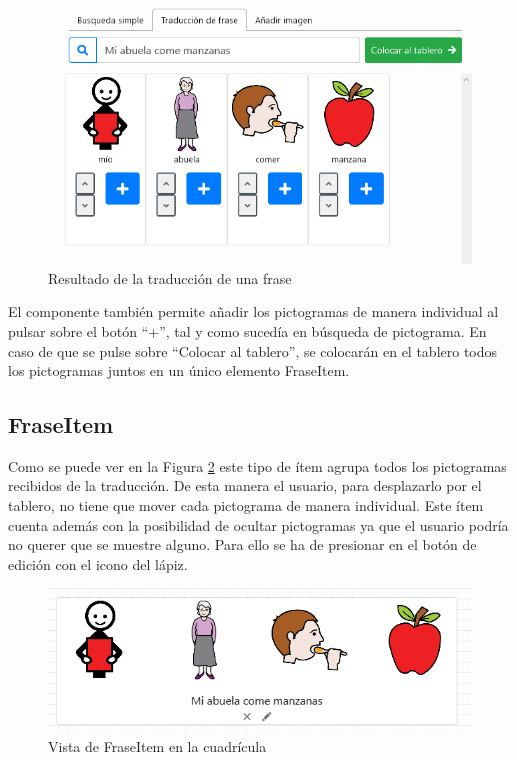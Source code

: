 \begin{figure}[h!]
	\centering
	\includegraphics[width=0.7\linewidth]{Imagenes/Bitmap/traduccionPicto}
	\caption{Resultado de la traducción de una frase}
	\label{fig:traduccionpicto}
\end{figure}

El componente también permite añadir los pictogramas de manera individual al pulsar sobre el botón “+”, tal y como sucedía en búsqueda de pictograma. En caso de que se pulse sobre “Colocar al tablero”, se colocarán en el tablero todos los pictogramas juntos en un único elemento FraseItem. 

\subsection{FraseItem}

Como se puede ver en la Figura \ref{fig:fraseitemoriginal} este tipo de  ítem agrupa todos los pictogramas recibidos de la traducción. De esta manera el usuario, para desplazarlo por el tablero, no tiene que mover cada pictograma de manera individual. Este ítem cuenta además con la posibilidad de ocultar pictogramas ya que el usuario podría no querer que se muestre alguno. Para ello se ha de presionar en el botón de edición con el icono del lápiz. 

\begin{figure}[h!]
	\centering
	\includegraphics[width=0.7\linewidth]{Imagenes/Bitmap/fraseItemOriginal}
	\caption{Vista de FraseItem en la cuadrícula}
	\label{fig:fraseitemoriginal}
\end{figure}


